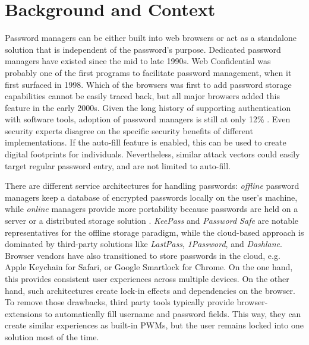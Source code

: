  

\section{Background and Context}

Password managers can be either built into web browsers or act as a standalone solution that is independent of the password's purpose. Dedicated password managers have existed since the mid to late 1990s. Web Confidential was probably one of the first programs to facilitate password management, when it first surfaced in 1998. Which of the browsers was first to add password storage capabilities cannot be easily traced back, but all major browsers added this feature in the early 2000s. Given the long history of supporting authentication with software tools, adoption of password managers is still at only 12\% \cite{Olmstead2017AmerciansCybersecurity}. Even security experts disagree on the specific security benefits of different implementations. If the auto-fill feature is enabled, this can be used to create digital footprints for individuals. Nevertheless, similar attack vectors could easily target regular password entry, and are not limited to auto-fill. 

There are different service architectures for handling passwords: \textit{offline} password managers keep a database of encrypted passwords locally on the user's machine, while \textit{online} managers provide more portability because passwords are held on a server or a distributed storage solution \cite{McCarney2012Tapas}. \textit{KeePass} and \textit{Password Safe} are notable representatives for the offline storage paradigm, while the cloud-based approach is dominated by third-party solutions like \textit{LastPass}, \textit{1Password}, and \textit{Dashlane}. Browser vendors have also transitioned to store passwords in the cloud, e.g. Apple Keychain for Safari, or Google Smartlock for Chrome. On the one hand, this provides consistent user experiences across multiple devices. On the other hand, such architectures create lock-in effects and dependencies on the browser. To remove those drawbacks, third party tools typically provide browser-extensions to automatically fill username and password fields. This way, they can create similar experiences as built-in PWMs, but the user remains locked into one solution most of the time.  

